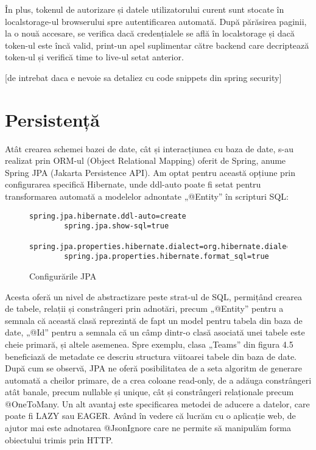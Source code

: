 În plus, tokenul de autorizare și datele utilizatorului curent sunt stocate în localstorage-ul browserului spre autentificarea automată. După părăsirea paginii, la o nouă accesare, se verifica dacă credențialele se află în localstorage și dacă token-ul este încă valid, print-un apel suplimentar către backend care decriptează token-ul și verifică time to live-ul setat anterior.

[de intrebat daca e nevoie sa detaliez cu code snippets din spring security]

\section{Persistență}

Atât crearea schemei bazei de date, cât și interacțiunea cu baza de date, s-au realizat prin ORM-ul (Object Relational Mapping) oferit de Spring, anume Spring JPA (Jakarta Persistence API). Am optat pentru această opțiune prin configurarea specifică Hibernate, unde ddl-auto poate fi setat pentru transformarea automată a modelelor adnontate „@Entity” în scripturi SQL:

\begin{figure}[hbtp]
	\begin{lstlisting}[frame=single]
		spring.jpa.hibernate.ddl-auto=create
		spring.jpa.show-sql=true
		spring.jpa.properties.hibernate.dialect=org.hibernate.dialect.PostgreSQLDialect
		spring.jpa.properties.hibernate.format_sql=true
	\end{lstlisting}
	\caption{Configurările JPA}
\end{figure}

Acesta oferă un nivel de abstractizare peste strat-ul de SQL, permițând crearea de tabele, relații și constrângeri prin adnotări, precum „@Entity” pentru a semnala că această clasă reprezintă de fapt un model pentru tabela din baza de date, „@Id” pentru a semnala că un câmp dintr-o clasă asociată unei tabele este cheie primară, și altele asemenea. Spre exemplu, clasa „Teams” din figura 4.5 beneficiază de metadate ce descriu structura viitoarei tabele din baza de date. După cum se observă, JPA ne oferă posibilitatea de a seta algoritm de generare automată a cheilor primare, de a crea coloane read-only, de a adăuga constrângeri atât banale, precum nullable și unique, cât și constrângeri relaționale precum @OneToMany. Un alt avantaj este specificarea metodei de aducere a datelor, care poate fi LAZY sau EAGER. Având în vedere că lucrăm cu o aplicație web, de ajutor mai este adnotarea @JsonIgnore care ne permite să manipulăm forma obiectului trimis prin HTTP.

